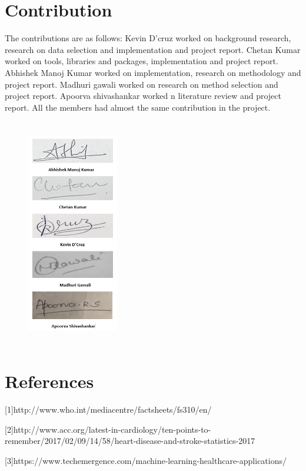 \documentclass[conference]{IEEEtran}
\begin{document}
\section*{Contribution}
The contributions are as follows:
Kevin D’cruz worked on background research, research on data selection and implementation and project report.
Chetan Kumar worked on tools, libraries and packages, implementation and project report.
Abhishek Manoj Kumar worked on implementation, research on methodology and project report.
Madhuri gawali worked on research on method selection and project report.
Apoorva shivashankar worked n literature review and project report. 
All the members had almost the same contribution in the project.



\begin{figure}[h!]
	
	\includegraphics[height=10cm, width=4cm]{images/signature}
	\label{fig20}
\end{figure}



\section*{References}
[1]http://www.who.int/mediacentre/factsheets/fs310/en/ 

[2]http://www.acc.org/latest-in-cardiology/ten-points-to-remember/2017/02/09/14/58/heart-disease-and-stroke-statistics-2017 

[3]https://www.techemergence.com/machine-learning-healthcare-applications/
\end{document}
